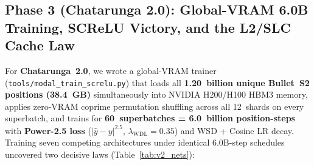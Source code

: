 \documentclass[10.5pt,letterpaper]{article}
\begin{document}
\subsection{Phase 3 (Chatarunga 2.0): Global-VRAM 6.0B Training, SCReLU Victory, and the L2/SLC Cache Law}

For \textbf{Chatarunga~2.0}, we wrote a global-VRAM trainer (\texttt{tools/modal\_train\_screlu.py}) that loads all \textbf{1.20~billion unique Bullet~S2 positions (38.4~GB)} simultaneously into NVIDIA H200/H100 HBM3 memory, applies zero-VRAM coprime permutation shuffling across all 12~shards on every superbatch, and trains for \textbf{60~superbatches = 6.0~billion position-steps} with \textbf{Power-2.5 loss} ($|\hat{y}-y|^{2.5}$, $\lambda_{\text{WDL}}=0.35$) and WSD + Cosine LR decay. Training seven competing architectures under identical 6.0B-step schedules uncovered two decisive laws (Table~\ref{tab:v2_nets}):

\begin{table}[H]
\centering
\caption{Chatarunga~2.0 6.0B-step global-VRAM neural suite evaluated under real 10-thread multi-core wall-clock play (50~ms/move UHO, \texttt{logs/v7\_nets\_wallclock\_50ms.log} \& \texttt{logs/v7\_kb8\_screlu1536\_vs\_screlu1024\_50ms.log}).}
\label{tab:v2_nets}
\end{table}
\end{document}
